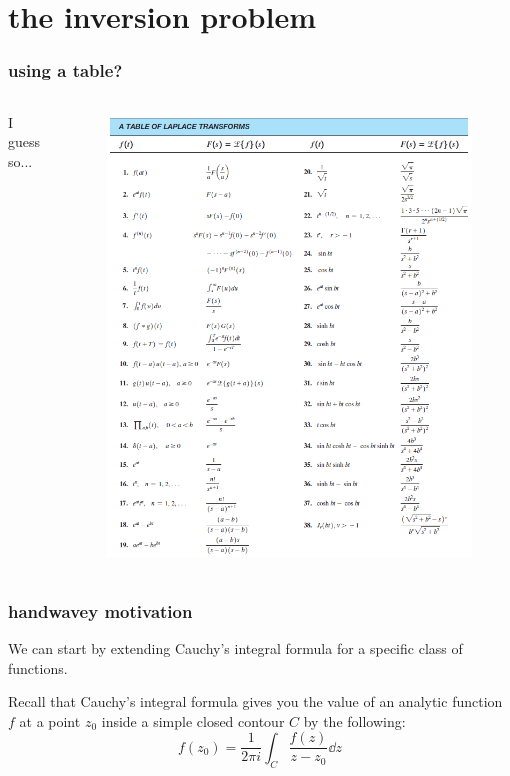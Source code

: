 \documentclass[mathserif]{beamer}
\begin{document}
\section{the inversion problem}

\begin{frame}
  \frametitle{using a table?}

  \begin{columns}

    I guess so...
    \begin{figure}[h]
      \centering
      \includegraphics[scale=0.33]{table}
    \end{figure}
  \end{columns}

\end{frame}

\begin{frame}
  \frametitle{handwavey motivation}

  We can start by extending Cauchy's integral formula for a specific class of functions.

  Recall that Cauchy's integral formula gives you the value of an analytic function $f$ at a point $z_0$ inside a simple closed contour $C$ by the following: \[f(z_0) = \frac{1}{2\pi i}\int_C \frac{f(z)}{z-z_0}\dd{z}\]

\end{frame}
\end{document}
